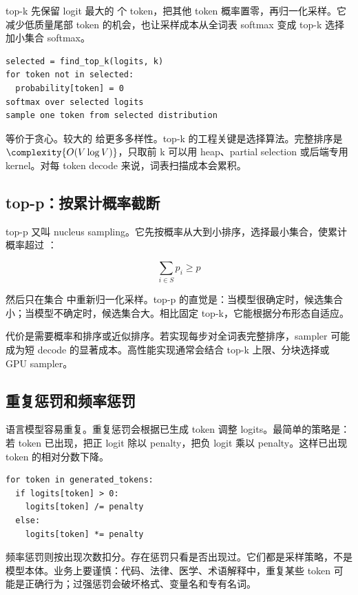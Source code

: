 top-k 先保留 logit 最大的  个 token，把其他 token 概率置零，再归一化采样。它减少低质量尾部 token 的机会，也让采样成本从全词表 softmax 变成 top-k 选择加小集合 softmax。

\begin{lstlisting}[numbers=none,caption={top-k 采样流程}]
selected = find_top_k(logits, k)
for token not in selected:
  probability[token] = 0
softmax over selected logits
sample one token from selected distribution
\end{lstlisting}

 等价于贪心。较大的  给更多多样性。top-k 的工程关键是选择算法。完整排序是 \(\complexity{O(V\log V)}\)，只取前 k 可以用 heap、partial selection 或后端专用 kernel。对每 token decode 来说，词表扫描成本会累积。

\subsection{top-p：按累计概率截断}

top-p 又叫 nucleus sampling。它先按概率从大到小排序，选择最小集合，使累计概率超过 ：

\[
\sum_{i \in S} p_i \ge p
\]

然后只在集合  中重新归一化采样。top-p 的直觉是：当模型很确定时，候选集合小；当模型不确定时，候选集合大。相比固定 top-k，它能根据分布形态自适应。

代价是需要概率和排序或近似排序。若实现每步对全词表完整排序，sampler 可能成为短 decode 的显著成本。高性能实现通常会结合 top-k 上限、分块选择或 GPU sampler。

\subsection{重复惩罚和频率惩罚}

语言模型容易重复。重复惩罚会根据已生成 token 调整 logits。最简单的策略是：若 token 已出现，把正 logit 除以 penalty，把负 logit 乘以 penalty。这样已出现 token 的相对分数下降。

\begin{lstlisting}[numbers=none,caption={重复惩罚示意}]
for token in generated_tokens:
  if logits[token] > 0:
    logits[token] /= penalty
  else:
    logits[token] *= penalty
\end{lstlisting}

频率惩罚则按出现次数扣分。存在惩罚只看是否出现过。它们都是采样策略，不是模型本体。业务上要谨慎：代码、法律、医学、术语解释中，重复某些 token 可能是正确行为；过强惩罚会破坏格式、变量名和专有名词。

